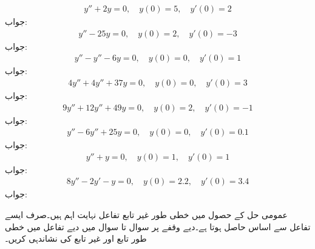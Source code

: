 \begin{align*}
y''+2y=0,\quad y(0)=5,\quad y'(0)=2
\end{align*}
جواب:
\begin{align*}
y''-25y=0,\quad y(0)=2,\quad y'(0)=-3
\end{align*}
جواب:
\begin{align*}
y''-y''-6y=0,\quad y(0)=0,\quad y'(0)=1
\end{align*}
جواب:
\begin{align*}
4y''+4y''+37y=0,\quad y(0)=0,\quad y'(0)=3
\end{align*}
جواب:
\begin{align*}
9y''+12y''+49y=0,\quad y(0)=2,\quad y'(0)=-1
\end{align*}
جواب:
\begin{align*}
y''-6y''+25y=0,\quad y(0)=0,\quad y'(0)=0.1
\end{align*}
جواب:
\begin{align*}
y''+y=0,\quad y(0)=1,\quad y'(0)=1
\end{align*}
جواب:
\begin{align*}
8y''-2y'-y=0,\quad y(0)=2.2,\quad y'(0)=3.4
\end{align*}
جواب:

عمومی حل کے حصول میں خطی طور غیر تابع تفاعل نہایت اہم ہیں۔صرف ایسے تفاعل سے اساس حاصل ہوتا ہے۔دیے وقفے پر سوال  تا سوال  میں دیے تفاعل میں خطی طور تابع اور غیر تابع کی نشاندہی کریں۔ 


